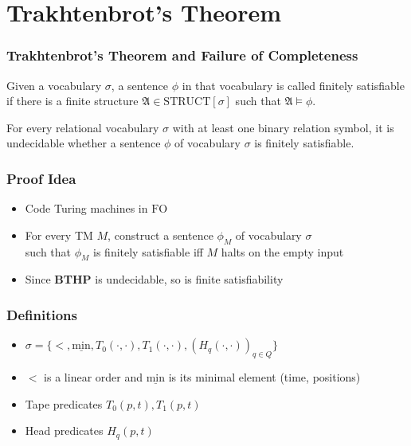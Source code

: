 \documentclass[handout]{beamer}
\newcommand{\FO}{\ensuremath{\mathrm{FO}}}
\newcommand{\structa}{\ensuremath{\mathfrak{A}}}
\newcommand{\minel}{\ensuremath{\underline{\mathrm{min}}}}
\newcommand{\blankcell}{\ensuremath{T_{0}}}
\newcommand{\nonblankcell}{\ensuremath{T_{1}}}
\begin{document}
\section{Trakhtenbrot's Theorem}

\begin{frame}
  \frametitle{Trakhtenbrot's Theorem and Failure of Completeness}

  \begin{definition}
    Given a vocabulary $\sigma$, a sentence $\phi$ in that vocabulary is called
    finitely satisfiable if there is a finite structure $\structa \in
    \mathrm{STRUCT}[\sigma]$ such that $\structa \models \phi$.
  \end{definition}
  
  \pause

  \begin{theorem}[Trakhtenbrot]
    For every relational vocabulary $\sigma$ with at least one binary relation
    symbol, it is undecidable whether a sentence $\phi$ of vocabulary
    $\sigma$ is finitely satisfiable.
  \end{theorem}

\end{frame}

\begin{frame}
  \frametitle{Proof Idea}

  \begin{itemize}
    \item Code Turing machines in $\FO$
    \item For every TM $M$, construct a sentence $\phi_M$ of vocabulary
    $\sigma$\\ such that $\phi_M$ is finitely satisfiable iff $M$ halts on the
    empty input
    \item Since \textbf{BTHP} is undecidable, so is finite satisfiability
  \end{itemize}

\end{frame}

\begin{frame}
  \frametitle{Definitions}

  \begin{itemize}
    \item $\sigma = \{<, \minel, \blankcell(\cdot, \cdot),
    \nonblankcell(\cdot,\cdot), (H_q(\cdot, \cdot))_{q \in Q}\}$\\
    \item $<$ is a linear order and $\minel$ is its minimal element (time,
    positions)
    \item Tape predicates $\blankcell(p,t), \nonblankcell(p,t)$
    \item Head predicates $H_q(p,t)$
  \end{itemize}
  
\end{frame}
\end{document}
